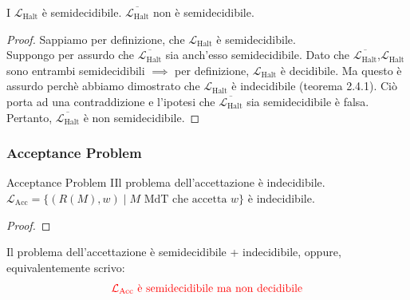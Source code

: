 \documentclass{article}  %
\theoremstyle{definition}
\begin{document}
\begin{theorem}{}
	I $\mathcal{L}_{\text{Halt}}$ è semidecidibile.
	$\overline{\mathcal{L}_{\text{Halt}}}$ non è semidecidibile.
	\footnotesize %
	\begin{proof}
		Sappiamo per definizione, che $\mathcal{L}_{\text{Halt}}$ è semidecidibile. \\
		Suppongo per assurdo che $\overline{\mathcal{L}_{\text{Halt}}}$ sia anch'esso semidecidibile. Dato che
		$\overline{\mathcal{L}_{\text{Halt}}}$,$\mathcal{L}_{\text{Halt}}$ sono entrambi semidecidibili $\implies$ per
		definizione, $\mathcal{L}_{\text{Halt}}$ è decidibile. Ma questo è assurdo perchè abbiamo dimostrato che
		$\mathcal{L}_{\text{Halt}}$ è indecidibile (teorema 2.4.1). Ciò porta ad una contraddizione e l'ipotesi che $\overline{\mathcal{L}_{\text{Halt}}}$
		sia semidecidibile è falsa. \\ Pertanto, $\overline{\mathcal{L}_{\text{Halt}}}$ è non semidecidibile.
	\end{proof}
\end{theorem}
\subsubsection{Acceptance Problem}
\begin{theorem}{Acceptance Problem}
	IIl problema dell'accettazione è indecidibile. \\
	$\mathcal{L}_{\text{Acc}} = \{(R(M),w) \mid M \text{ MdT che accetta } w\}$ è indecidibile.
	\footnotesize %
	\begin{proof}
	\end{proof}
	\end{theorem}
	Il problema dell'accettazione è semidecidibile + indecidibile, oppure, equivalentemente scrivo:
\begin{align*}
	\textcolor{red}{\mathcal{L}_{\text{Acc}} \text{ è semidecidibile ma non decidibile}}
\end{align*}
\end{document}
